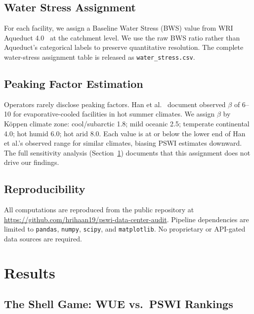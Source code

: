 \documentclass[conference,10pt]{IEEEtran}
\begin{document}
\subsection{Water Stress Assignment}

For each facility, we assign a Baseline Water Stress (BWS) value from
WRI Aqueduct 4.0~\cite{kuzma2023aqueduct} at the catchment level. We use
the raw BWS ratio rather than Aqueduct's categorical labels to preserve
quantitative resolution. The complete water-stress assignment table is
released as \texttt{water\_stress.csv}.

\subsection{Peaking Factor Estimation}

Operators rarely disclose peaking factors. Han et al.~\cite{han2026}
document observed $\beta$ of 6--10 for evaporative-cooled facilities in
hot summer climates. We assign $\beta$ by Köppen climate zone:
cool/subarctic 1.8; mild oceanic 2.5; temperate continental 4.0; hot
humid 6.0; hot arid 8.0. Each value is at or below the lower end of Han
et al.'s observed range for similar climates, biasing PSWI estimates
downward. The full sensitivity analysis (Section~\ref{sec:results})
documents that this assignment does not drive our findings.

\subsection{Reproducibility}

All computations are reproduced from the public repository at
\url{https://github.com/hrihaan19/pswi-data-center-audit}. Pipeline
dependencies are limited to \texttt{pandas}, \texttt{numpy},
\texttt{scipy}, and \texttt{matplotlib}. No proprietary or API-gated
data sources are required.

\section{Results}
\label{sec:results}

\subsection{The Shell Game: WUE vs.\ PSWI Rankings}
\end{document}
